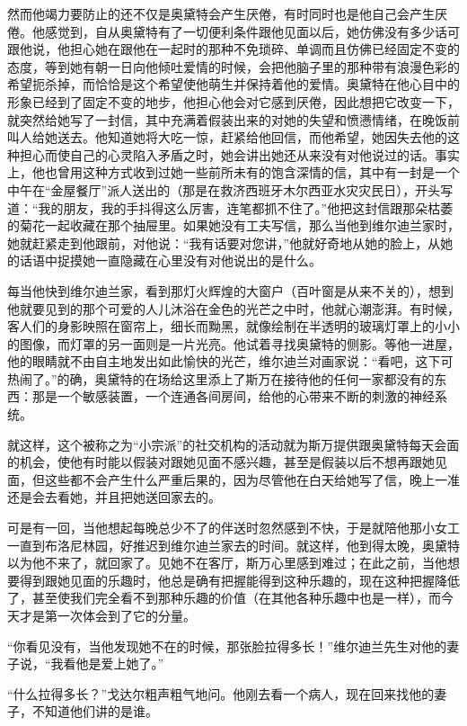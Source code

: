 \par 然而他竭力要防止的还不仅是奥黛特会产生厌倦，有时同时也是他自己会产生厌倦。他感觉到，自从奥黛特有了一切便利条件跟他见面以后，她仿佛没有多少话可跟他说，他担心她在跟他在一起时的那种不免琐碎、单调而且仿佛已经固定不变的态度，等到她有朝一日向他倾吐爱情的时候，会把他脑子里的那种带有浪漫色彩的希望扼杀掉，而恰恰是这个希望使他萌生并保持着他的爱情。奥黛特在他心目中的形象已经到了固定不变的地步，他担心他会对它感到厌倦，因此想把它改变一下，就突然给她写了一封信，其中充满着假装出来的对她的失望和愤懑情绪，在晚饭前叫人给她送去。他知道她将大吃一惊，赶紧给他回信，而他希望，她因失去他的这种担心而使自己的心灵陷入矛盾之时，她会讲出她还从来没有对他说过的话。事实上，他也曾用这种方式收到过她一些前所未有的饱含深情的信，其中有一封是一个中午在“金屋餐厅”派人送出的（那是在救济西班牙木尔西亚水灾灾民日），开头写道：“我的朋友，我的手抖得这么厉害，连笔都抓不住了。”他把这封信跟那朵枯萎的菊花一起收藏在那个抽屉里。如果她没有工夫写信，那么当他到维尔迪兰家时，她就赶紧走到他跟前，对他说：“我有话要对您讲，”他就好奇地从她的脸上，从她的话语中捉摸她一直隐藏在心里没有对他说出的是什么。
\par 每当他快到维尔迪兰家，看到那灯火辉煌的大窗户（百叶窗是从来不关的），想到他就要见到的那个可爱的人儿沐浴在金色的光芒之中时，他就心潮澎湃。有时候，客人们的身影映照在窗帘上，细长而黝黑，就像绘制在半透明的玻璃灯罩上的小小的图像，而灯罩的另一面则是一片光亮。他试着寻找奥黛特的侧影。等他一进屋，他的眼睛就不由自主地发出如此愉快的光芒，维尔迪兰对画家说：“看吧，这下可热闹了。”的确，奥黛特的在场给这里添上了斯万在接待他的任何一家都没有的东西：那是一个敏感装置，一个连通各间房间，给他的心带来不断的刺激的神经系统。
\par 就这样，这个被称之为“小宗派”的社交机构的活动就为斯万提供跟奥黛特每天会面的机会，使他有时能以假装对跟她见面不感兴趣，甚至是假装以后不想再跟她见面，但这些都不会产生什么严重后果的，因为尽管他在白天给她写了信，晚上一准还是会去看她，并且把她送回家去的。
\par 可是有一回，当他想起每晚总少不了的伴送时忽然感到不快，于是就陪他那小女工一直到布洛尼林园，好推迟到维尔迪兰家去的时间。就这样，他到得太晚，奥黛特以为他不来了，就回家了。见她不在客厅，斯万心里感到难过；在此之前，当他想要得到跟她见面的乐趣时，他总是确有把握能得到这种乐趣的，现在这种把握降低了，甚至使我们完全看不到那种乐趣的价值（在其他各种乐趣中也是一样），而今天才是第一次体会到了它的分量。
\par “你看见没有，当他发现她不在的时候，那张脸拉得多长！”维尔迪兰先生对他的妻子说，“我看他是爱上她了。”
\par “什么拉得多长？”戈达尔粗声粗气地问。他刚去看一个病人，现在回来找他的妻子，不知道他们讲的是谁。
